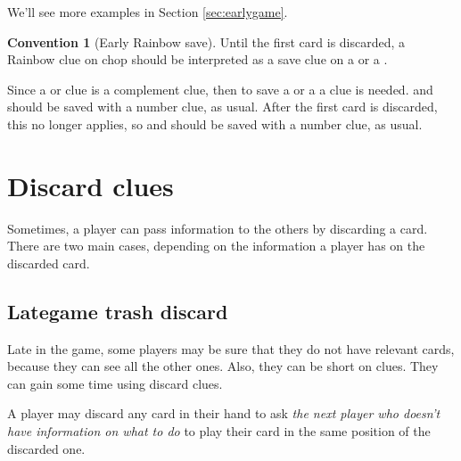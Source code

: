 \documentclass[a4paper]{article}
\theoremstyle{plain}
\theoremstyle{definition}
\newtheorem{convention}[theorem]{Convention}
\begin{document}
We'll see more examples in Section \ref{sec:earlygame}.


\begin{convention}[Early Rainbow save]
	Until the first card is discarded, a Rainbow clue on chop should be interpreted as a save clue on a  or a .
\end{convention}

Since a  or  clue is a complement clue, then to save a  or a  a  clue is needed.  and  should be saved with a number clue, as usual. After the first card is discarded, this no longer applies, so  and  should be saved with a number clue, as usual.

\section{Discard clues}

Sometimes, a player can pass information to the others by discarding a card. There are two main cases, depending on the information a player has on the discarded card.

%
%

\subsection{Lategame trash discard}

Late in the game, some players may be sure that they do not have relevant cards, because they can see all the other ones. Also, they can be short on clues. They can gain some time using discard clues.

A player may discard any card in their hand to ask \textit{the next player who doesn't have information on what to do} to play their card in the same position of the discarded one.
\end{document}
